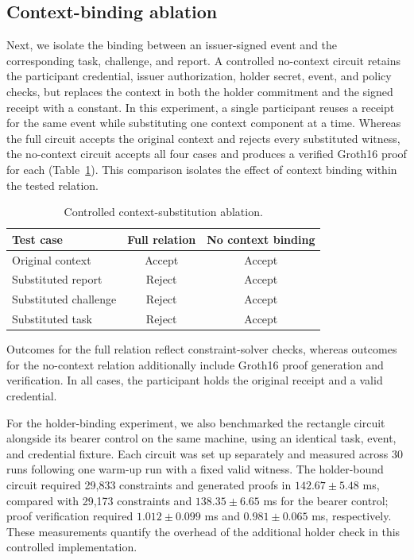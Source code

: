 \documentclass[pdflatex,iicol,sn-mathphys-num]{sn-jnl}
\begin{document}
\subsection{Context-binding ablation}
Next, we isolate the binding between an issuer-signed event and the corresponding task, challenge, and report. A controlled no-context circuit retains the participant credential, issuer authorization, holder secret, event, and policy checks, but replaces the context in both the holder commitment and the signed receipt with a constant. In this experiment, a single participant reuses a receipt for the same event while substituting one context component at a time. Whereas the full circuit accepts the original context and rejects every substituted witness, the no-context circuit accepts all four cases and produces a verified Groth16 proof for each (Table~\ref{tab:context-ablation}). This comparison isolates the effect of context binding within the tested relation.

\begin{table}[t]
\centering\footnotesize\setlength{\tabcolsep}{3pt}\caption{Controlled context-substitution ablation.}\label{tab:context-ablation}
\begin{tabular}{@{}lcc@{}}\toprule
Test case & Full relation & No context binding \\\midrule
Original context & Accept & Accept \\
Substituted report & Reject & Accept \\
Substituted challenge & Reject & Accept \\
Substituted task & Reject & Accept \\\bottomrule
\end{tabular}\par\vspace{2pt}
\footnotesize Outcomes for the full relation reflect constraint-solver checks, whereas outcomes for the no-context relation additionally include Groth16 proof generation and verification. In all cases, the participant holds the original receipt and a valid credential.
\end{table}

For the holder-binding experiment, we also benchmarked the rectangle circuit alongside its bearer control on the same machine, using an identical task, event, and credential fixture. Each circuit was set up separately and measured across 30 runs following one warm-up run with a fixed valid witness. The holder-bound circuit required 29,833 constraints and generated proofs in $142.67\pm5.48$ ms, compared with 29,173 constraints and $138.35\pm6.65$ ms for the bearer control; proof verification required $1.012\pm0.099$ ms and $0.981\pm0.065$ ms, respectively. These measurements quantify the overhead of the additional holder check in this controlled implementation.
\end{document}
